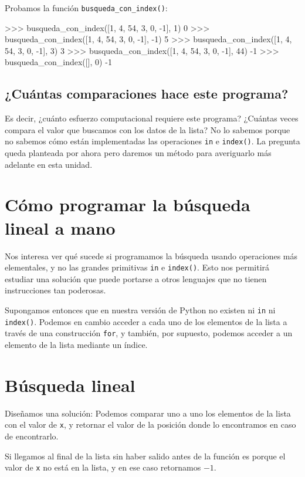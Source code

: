 Probamos la función \verb+busqueda_con_index()+:

\begin{codigo-python-sn}
>>> busqueda_con_index([1, 4, 54, 3, 0, -1], 1)
0
>>> busqueda_con_index([1, 4, 54, 3, 0, -1], -1)
5
>>> busqueda_con_index([1, 4, 54, 3, 0, -1], 3)
3
>>> busqueda_con_index([1, 4, 54, 3, 0, -1], 44)
-1
>>> busqueda_con_index([], 0)
-1
\end{codigo-python-sn}

\subsection*{¿Cuántas comparaciones hace este programa?}

Es decir, ¿cuánto esfuerzo computacional requiere
este programa? ¿Cuántas veces compara el valor que buscamos con los datos de
la lista? No lo sabemos porque no sabemos cómo están implementadas las
operaciones \lstinline+in+ e \lstinline+index()+. La pregunta queda planteada
por ahora pero daremos un método para averiguarlo más adelante en esta unidad.


\section{Cómo programar la búsqueda lineal a mano}

Nos interesa ver qué sucede si programamos la búsqueda usando operaciones más
elementales, y no las grandes primitivas \lstinline+in+ e \lstinline+index()+.
Esto nos permitirá estudiar una solución que puede portarse a otros lenguajes
que no tienen instrucciones tan poderosas.

Supongamos entonces que en nuestra versión de Python no existen ni \lstinline+in+
ni \lstinline+index()+. Podemos en cambio acceder a cada uno de los elementos
de la lista a través de una construcción \lstinline+for+, y también, por
supuesto, podemos acceder a un elemento de la lista mediante un índice.

\section{Búsqueda lineal}

Diseñamos una solución: Podemos comparar uno a uno los elementos de la
lista con el valor de \lstinline!x!, y retornar el valor de la posición
donde lo encontramos en caso de encontrarlo.

Si llegamos al final de la lista sin haber salido antes de la función es
porque el valor de \lstinline!x! no está en la lista, y en ese caso
retornamos $-1$.

